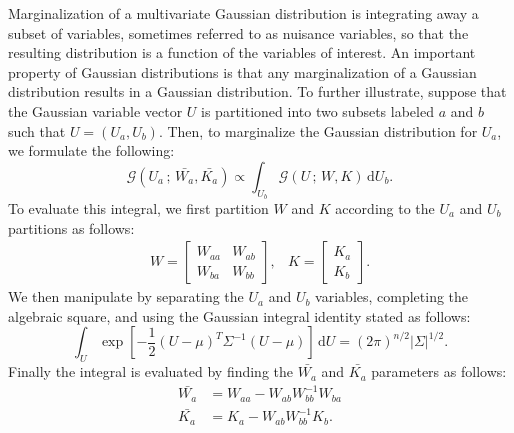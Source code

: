 Marginalization of a multivariate Gaussian distribution is integrating away a subset of variables, sometimes referred to as nuisance variables, so that the resulting distribution is a function of the variables of interest.
An important property of Gaussian distributions is that any marginalization of a Gaussian distribution results in a Gaussian distribution.
To further illustrate, suppose that the Gaussian variable vector $U$ is partitioned into two subsets labeled $a$ and $b$ such that $U = (U_a,U_b)$.
Then, to marginalize the Gaussian distribution for $U_a$, we formulate the following:
\begin{equation}
	\mathcal{G}(U_a\,;\,\bar{W_a},\bar{K_a}) \propto \int_{U_b} \mathcal{G}(U\,;\,W,K)\, \mathrm{d}U_b.
	\label{eqn:gausDisMarj}
\end{equation}
To evaluate this integral, we first partition $W$ and $K$ according to the $U_a$ and $U_b$ partitions as follows:
\begin{equation}
	\begin{array}{cc}
		W=\left[%
		\begin{array}{llll}
			W_{aa} & W_{ab} \\
			W_{ba} & W_{bb}
		\end{array}%
		\right],&%
		K=\left[%
		\begin{array}{l}
			K_a \\
			K_b
		\end{array}
		\right].
	\end{array}
	\label{eqn:WKPartitions}
\end{equation}
We then manipulate  by separating the $U_a$ and $U_b$ variables, completing the algebraic square, and using the Gaussian integral identity stated as follows:
\begin{equation}
	\int_U \exp\left[-\frac{1}{2}(U-\mu)^T\Sigma^{-1}(U-\mu)\right]\,\mathrm{d}U = (2\pi)^{n/2}|\Sigma|^{1/2}.
	\label{eqn:GausInteg}
\end{equation}
Finally the integral  is evaluated by finding the $\bar{W_a}$ and $\bar{K_a}$ parameters as follows:
\begin{align}
	\bar{W_a} &= W_{aa} - W_{ab} W_{bb}^{-1} W_{ba}\\
	\bar{K_a} &= K_{a} - W_{ab} W_{bb}^{-1} K_{b}.
	\label{eqn:gausDisMarjWK}
\end{align}
